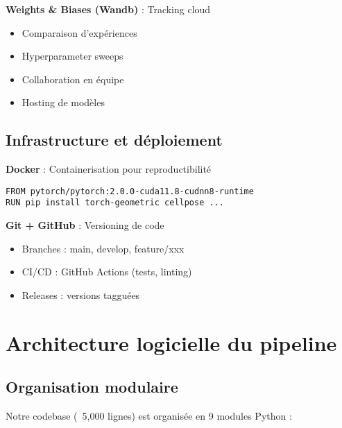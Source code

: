 \textbf{Weights \& Biases (Wandb)} : Tracking cloud
\begin{itemize}
    \item Comparaison d'expériences
    \item Hyperparameter sweeps
    \item Collaboration en équipe
    \item Hosting de modèles
\end{itemize}

\subsection{Infrastructure et déploiement}

\textbf{Docker} : Containerisation pour reproductibilité
\begin{verbatim}
FROM pytorch/pytorch:2.0.0-cuda11.8-cudnn8-runtime
RUN pip install torch-geometric cellpose ...
\end{verbatim}

\textbf{Git + GitHub} : Versioning de code
\begin{itemize}
    \item Branches : main, develop, feature/xxx
    \item CI/CD : GitHub Actions (tests, linting)
    \item Releases : versions tagguées
\end{itemize}

\section{Architecture logicielle du pipeline}

\subsection{Organisation modulaire}

Notre codebase (~5,000 lignes) est organisée en 9 modules Python :

